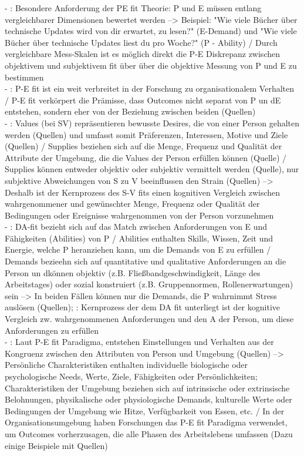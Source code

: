 - \cite[S. 5]{caplan:1987}: Besondere Anforderung der PE fit Theorie: P und E müssen entlang vergleichbarer Dimensionen bewertet werden --> Beispiel: "Wie viele Bücher über technische Updates wird von dir erwartet, zu lesen?" (E-Demand) und "Wie viele Bücher über technische Updates liest du pro Woche?" (P - Ability) / Durch vergleichbare Mess-Skalen ist es möglich direkt die P-E Diskrepanz zwischen objektivem und subjektivem fit über über die objektive Messung von P und E zu bestimmen \\
- \cite[S. 1]{edwards:1996}: P-E fit ist ein weit verbreitet in der Forschung zu organisationalem Verhalten / P-E fit verkörpert die Prämisse, dass Outcomes nicht separat von P un dE entstehen, sondern eher von der Beziehung zwischen beiden (Quellen)\\
- \cite[S. 3]{edwards:1996}: Values (bei SV) repräsentieren bewusste Desires, die von einer Person gehalten werden (Quellen) und umfasst somit Präferenzen, Interessen, Motive und Ziele (Quellen) / Supplies beziehen sich auf die Menge, Frequenz und Qualität der Attribute der Umgebung, die die Values der Person erfüllen können (Quelle) / Supplies können entweder objektiv oder subjektiv vermittelt werden (Quelle), nur subjektive Abweichungen von S zu V beeinflussen den Strain (Quellen) --> Deshalb ist der Kernprozess des S-V fits einen kognitiven Vergleich zwischen wahrgenommener und gewünschter Menge, Frequenz oder Qualität der Bedingungen oder Ereignisse wahrgenommen von der Person vorzunehmen \\
- \cite[S. 5]{edwards:1996}: DA-fit bezieht sich auf das Match zwischen Anforderungen von E und Fähigkeiten (Abilities) von P / Abilities enthalten Skills, Wissen, Zeit und Energie, welche P heranziehen kann, um die Demands von E zu erfüllen / Demands bezieehn sich auf quantitative und qualitative Anforderungen an die Person un dkönnen objektiv (z.B. Fließbandgeschwindigkeit, Länge des Arbeitstages) oder sozial konstruiert (z.B. Gruppennormen, Rollenerwartungen) sein --> In beiden Fällen können nur die Demands, die P wahrnimmt Stress auslösen (Quellen); \cite[S. 5f.]{edwards:1996}: Kernprozess der dem DA fit unterliegt ist der kognitive Vergleich zw. wahrgenommenen Anforderungen und den A der Person, um diese Anforderungen zu erfüllen \\
- \cite[S. 1]{edwards:2004}: Laut P-E fit Paradigma, entstehen Einstellungen und Verhalten aus der Kongruenz zwischen den Attributen von Person und Umgebung (Quellen) --> Persönliche Charakteristiken enthalten individuelle biologische oder psychologische Needs, Werte, Ziele, Fähigkeiten oder Persönlichkeiten; Charakteristiken der Umgebung beziehen sich auf intrinsische oder extrinsische Belohnungen, physikalische oder physiologische Demands, kulturelle Werte oder Bedingungen der Umgebung wie Hitze, Verfügbarkeit von Essen, etc. / In der Organisationsumgebung haben Forschungen das P-E fit Paradigma verwendet, um Outcomes vorherzusagen, die alle Phasen des Arbeitslebens umfassen (Dazu einige Beispiele mit Quellen) \\
